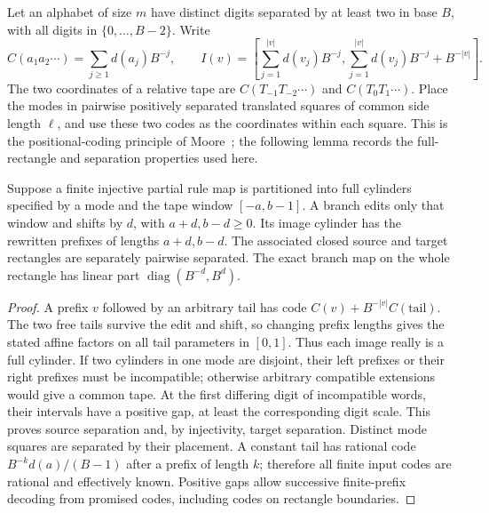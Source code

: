 Let an alphabet of size $m$ have distinct digits separated by at least two
in base $B$, with all digits in $\{0,\ldots,B-2\}$.  Write
\[
 C(a_1a_2\cdots)=\sum_{j\ge1}d(a_j)B^{-j},\qquad
 I(v)=\left[\sum_{j=1}^{|v|}d(v_j)B^{-j},
 \sum_{j=1}^{|v|}d(v_j)B^{-j}+B^{-|v|}\right].
\]
The two coordinates of a relative tape are $C(T_{-1}T_{-2}\cdots)$
and $C(T_0T_1\cdots)$.  Place the modes in pairwise positively separated translated squares of
common side length $\ell$, and use these two codes as the coordinates
within each square.  This is the positional-coding principle of
Moore~\cite{Moore1991}; the following lemma records the full-rectangle
and separation properties used here.

\begin{lemma}\label{sv:full-cylinders}
Suppose a finite injective partial rule map is partitioned into full
cylinders specified by a mode and the tape window $[-a,b-1]$.  A branch
edits only that window and shifts by $d$, with $a+d,b-d\ge0$.
Its image cylinder has the rewritten prefixes of lengths $a+d,b-d$.
The associated closed source and target rectangles are separately
pairwise separated.  The exact branch map on the whole rectangle has
linear part $\operatorname{diag}(B^{-d},B^d)$.
\end{lemma}
\begin{proof}
A prefix $v$ followed by an arbitrary tail has code
$C(v)+B^{-|v|}C(\text{tail})$.  The two free tails survive the edit and
shift, so changing prefix lengths gives the stated affine factors on all
tail parameters in $[0,1]$.  Thus each image really is a full cylinder.
If two cylinders in one mode are disjoint, their left prefixes or their
right prefixes must be incompatible; otherwise arbitrary compatible
extensions would give a common tape.  At the first differing digit of
incompatible words, their intervals have a positive gap, at least the
corresponding digit scale.  This proves source separation and, by
injectivity, target separation.  Distinct mode squares are separated by
their placement.  A constant tail has rational code
$B^{-k}d(a)/(B-1)$ after a prefix of length $k$; therefore all finite
input codes are rational and effectively known.  Positive gaps allow
successive finite-prefix decoding from promised codes, including codes
on rectangle boundaries.
\end{proof}

